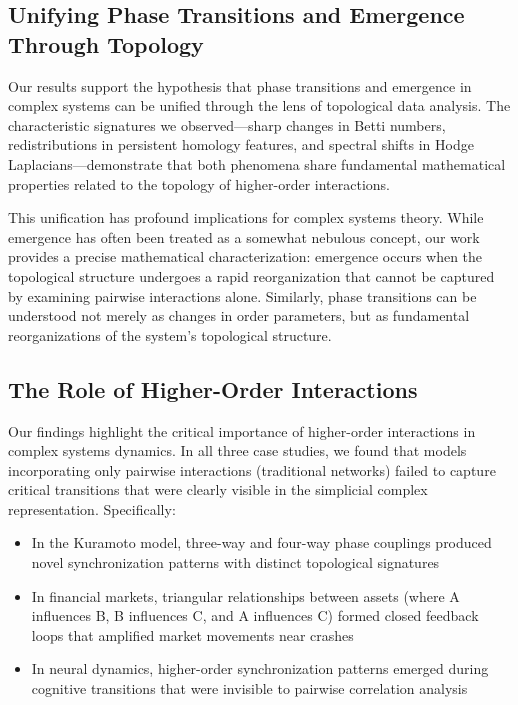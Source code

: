 \subsection{Unifying Phase Transitions and Emergence Through Topology}
Our results support the hypothesis that phase transitions and emergence in complex systems can be unified through the lens of topological data analysis. The characteristic signatures we observed—sharp changes in Betti numbers, redistributions in persistent homology features, and spectral shifts in Hodge Laplacians—demonstrate that both phenomena share fundamental mathematical properties related to the topology of higher-order interactions.

This unification has profound implications for complex systems theory. While emergence has often been treated as a somewhat nebulous concept, our work provides a precise mathematical characterization: emergence occurs when the topological structure undergoes a rapid reorganization that cannot be captured by examining pairwise interactions alone. Similarly, phase transitions can be understood not merely as changes in order parameters, but as fundamental reorganizations of the system's topological structure.

\subsection{The Role of Higher-Order Interactions}
Our findings highlight the critical importance of higher-order interactions in complex systems dynamics. In all three case studies, we found that models incorporating only pairwise interactions (traditional networks) failed to capture critical transitions that were clearly visible in the simplicial complex representation. Specifically:

\begin{itemize}[leftmargin=*]
  \item In the Kuramoto model, three-way and four-way phase couplings produced novel synchronization patterns with distinct topological signatures
  \item In financial markets, triangular relationships between assets (where A influences B, B influences C, and A influences C) formed closed feedback loops that amplified market movements near crashes
  \item In neural dynamics, higher-order synchronization patterns emerged during cognitive transitions that were invisible to pairwise correlation analysis
\end{itemize}

